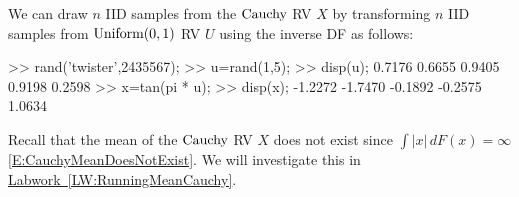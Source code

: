 \begin{simulation}[$\cauchy$]\label{SIM:StdCauchy}
We can draw $n$ IID samples from the $\cauchy$ RV $X$ by transforming $n$ IID samples from $\mbox{{\rm Uniform}}(0,1)$ RV $U$ using the inverse DF as follows:
\begin{VrbM}
>> rand('twister',2435567);        %
>> u=rand(1,5);			%
>> disp(u);			%
    0.7176    0.6655    0.9405    0.9198    0.2598
>> x=tan(pi * u);     %
>> disp(x);  %
   -1.2272   -1.7470   -0.1892   -0.2575    1.0634
\end{VrbM}
\end{simulation}
 Recall that the mean of the $\cauchy$ RV $X$ does not exist since $\int \left|x\right|\,dF(x) = \infty$ \eqref{E:CauchyMeanDoesNotExist}.  We will investigate this in \hyperref[LW:RunningMeanCauchy]{Labwork~\ref*{LW:RunningMeanCauchy}}.

